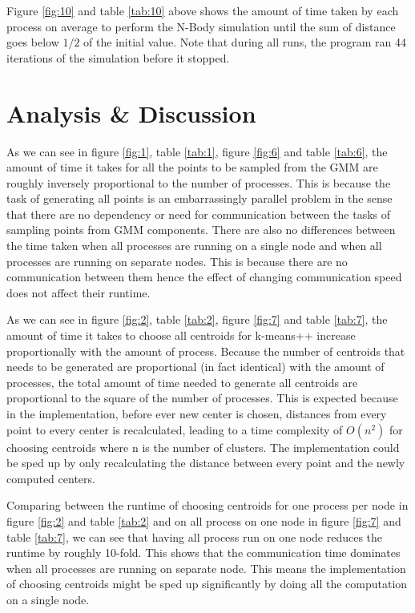 \documentclass{article}
\begin{document}
Figure \ref{fig:10} and table \ref{tab:10} above shows the amount of time taken by each process on
average to perform the N-Body simulation until the sum of distance goes below \(1/2\) of the initial
value. Note that during all runs, the program ran 44 iterations of the simulation before it stopped.

\section*{Analysis \& Discussion}
As we can see in figure \ref{fig:1}, table \ref{tab:1}, figure \ref{fig:6} and table \ref{tab:6},
the amount of time it takes for all the points to be sampled from the GMM are roughly inversely
proportional to the number of processes. This is because the task of generating all points is an
embarrassingly parallel \cite{shavit2011art} problem in the sense that there are no dependency or
need for communication between the tasks of sampling points from GMM components. There are also no
differences between the time taken when all processes are running on a single node and when all
processes are running on separate nodes. This is because there are no communication between them
hence the effect of changing communication speed does not affect their runtime.

As we can see in figure \ref{fig:2}, table \ref{tab:2}, figure \ref{fig:7} and table \ref{tab:7},
the amount of time it takes to choose all centroids for k-means++ increase proportionally with the
amount of process. Because the number of centroids that needs to be generated are proportional (in
fact identical) with the amount of processes, the total amount of time needed to generate all
centroids are proportional to the square of the number of processes. This is expected because in the
implementation, before ever new center is chosen, distances from every point to every center is
recalculated, leading to a time complexity of \(O(n^2)\) for choosing centroids where n is the
number of clusters. The implementation could be sped up by only recalculating the distance between
every point and the newly computed centers.

Comparing between the runtime of choosing centroids for one process per node in figure \ref{fig:2}
and table \ref{tab:2} and on all process on one node in figure \ref{fig:7} and table \ref{tab:7}, we
can see that having all process run on one node reduces the runtime by roughly 10-fold. This shows
that the communication time dominates when all processes are running on separate node. This means
the implementation of choosing centroids might be sped up significantly by doing all the computation
on a single node.
\end{document}
